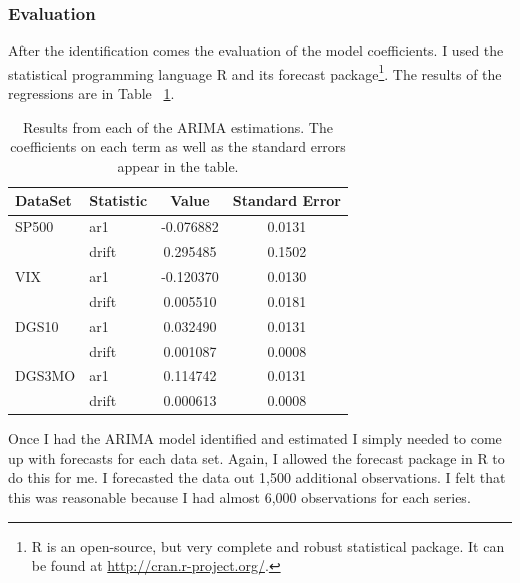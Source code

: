 \documentclass[a4paper, 11pt, twoside]{article}
\theoremstyle{definition} %
\numberwithin{equation}{section}
\begin{document}
    \subsubsection{Evaluation} \label{ssub:evaluation}

      After the identification comes the evaluation of the model coefficients. I used the statistical programming language R and its forecast package\footnote{R is an open-source, but very complete and robust statistical package. It can be found at \url{http://cran.r-project.org/}.}. The results of the regressions are in Table ~\ref{tab:arimasum}.

      \begin{table}[h!]
        \begin{centering}
          \begin{tabular}{|l|l|cc|}
          \hline
            \rowcolor{gray!45} DataSet &  Statistic & Value & Standard Error\\
            \hline
            \hline
            \rowcolor{gray!7} SP500  & ar1   & -0.076882 &   0.0131 \\
            \rowcolor{gray!23} {} &   drift &  0.295485 &   0.1502 \\
            \rowcolor{gray!7} VIX   &  ar1   & -0.120370 &   0.0130 \\
            \rowcolor{gray!23} {} &   drift &  0.005510 &   0.0181 \\
            \rowcolor{gray!7} DGS10  & ar1   &  0.032490 &   0.0131 \\
            \rowcolor{gray!23} {} &  drift &  0.001087 &   0.0008 \\
            \rowcolor{gray!7} DGS3MO & ar1   &  0.114742 &   0.0131 \\
            \rowcolor{gray!23} {} & drift &  0.000613 &   0.0008 \\
          \bottomrule
          \end{tabular}
          \captionsetup{width=5.5in}
          \caption{Results from each of the ARIMA estimations. The coefficients on each term as well as the standard errors appear in the table.}
          \label{tab:arimasum}
        \end{centering}
      \end{table}

      Once I had the ARIMA model identified and estimated I simply needed to come up with forecasts for each data set. Again, I allowed the forecast package in R to do this for me. I forecasted the data out 1,500 additional observations. I felt that this was reasonable because I had almost 6,000 observations for each series.
\end{document}
